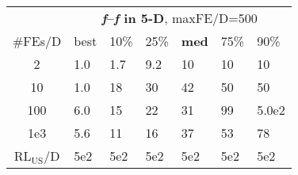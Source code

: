 \begin{tabular}{c|llllll}
 & \multicolumn{6}{|c}{\textbf{\textit{f}\raisebox{-0.35ex}{1}--\textit{f}\raisebox{-0.35ex}{24} in 5-D}, maxFE/D=500}\\
\#FEs/D & best & 10\% & 25\% & \textbf{med} & 75\% & 90\%\\
2 & \hspace*{1ex}1.0 & \hspace*{1ex}1.7 & \hspace*{1ex}9.2 & 10 & 10 & 10\\
10 & \hspace*{1ex}1.0 & 18 & 30 & 42 & 50 & 50\\
100 & \hspace*{1ex}6.0 & 15 & 22 & 31 & 99 & 5.0e2\\
1e3 & \hspace*{1ex}5.6 & 11 & 16 & 37 & 53 & 78\\
$\text{RL}_{\text{US}}$/D & 5e2 & 5e2 & 5e2 & 5e2 & 5e2 & 5e2
\end{tabular}
